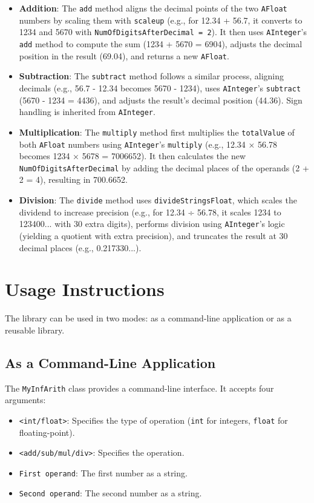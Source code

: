 \documentclass[a4paper,12pt]{article}
\begin{document}
\begin{itemize}
    \item \textbf{Addition}: The \texttt{add} method aligns the decimal points of the two \texttt{AFloat} numbers by scaling them with \texttt{scaleup} (e.g., for 12.34 + 56.7, it converts to 1234 and 5670 with \texttt{NumOfDigitsAfterDecimal = 2}). It then uses \texttt{AInteger}'s \texttt{add} method to compute the sum (1234 + 5670 = 6904), adjusts the decimal position in the result (69.04), and returns a new \texttt{AFloat}.
    \item \textbf{Subtraction}: The \texttt{subtract} method follows a similar process, aligning decimals (e.g., 56.7 - 12.34 becomes 5670 - 1234), uses \texttt{AInteger}'s \texttt{subtract} (5670 - 1234 = 4436), and adjusts the result's decimal position (44.36). Sign handling is inherited from \texttt{AInteger}.
    \item \textbf{Multiplication}: The \texttt{multiply} method first multiplies the \texttt{totalValue} of both \texttt{AFloat} numbers using \texttt{AInteger}'s \texttt{multiply} (e.g., 12.34 × 56.78 becomes 1234 × 5678 = 7006652). It then calculates the new \texttt{NumOfDigitsAfterDecimal} by adding the decimal places of the operands (2 + 2 = 4), resulting in 700.6652.
    \item \textbf{Division}: The \texttt{divide} method uses \texttt{divideStringsFloat}, which scales the dividend to increase precision (e.g., for 12.34 ÷ 56.78, it scales 1234 to 123400... with 30 extra digits), performs division using \texttt{AInteger}'s logic (yielding a quotient with extra precision), and truncates the result at 30 decimal places (e.g., 0.217330...).
\end{itemize}





\section{Usage Instructions}
The library can be used in two modes: as a command-line application or as a reusable library.

\subsection{As a Command-Line Application}
The \texttt{MyInfArith} class provides a command-line interface. It accepts four arguments:
\begin{itemize}
    \item \texttt{<int/float>}: Specifies the type of operation (\texttt{int} for integers, \texttt{float} for floating-point).
    \item \texttt{<add/sub/mul/div>}: Specifies the operation.
    \item \texttt{First operand}: The first number as a string.
    \item \texttt{Second operand}: The second number as a string.
\end{itemize}
\end{document}
